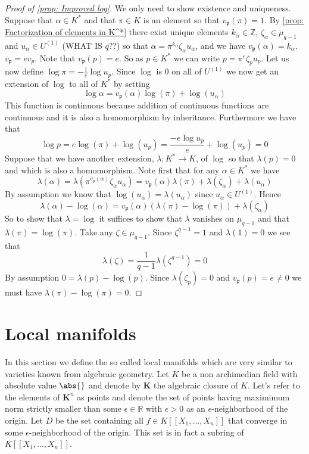 \documentclass{article}
\newcommand{\mfrak}[1]{\mathfrak{#1}}
\newcommand{\mbb}[1]{\mathbb{#1}}
\numberwithin{equation}{section}
\begin{document}
\begin{proof}[Proof of \cref{prop: Improved log}]
    We only need to show existence and uniqueness. Suppose that $\alpha \in K^*$ and that $\pi \in K$ is an element so that $v_\mfrak p(\pi) = 1$. By \cref{prop: Factorization of elements in K^*} there exist unique elements $k_\alpha \in \mbb Z$, $\zeta_\alpha \in \mu_{q-1}$ and $u_\alpha \in U^{(1)}$ (WHAT IS $q$??) so that $\alpha = \pi^{k_\alpha} \zeta_\alpha u_\alpha$, and we have $v_\mfrak p(\alpha) = k_\alpha$.
    $v_\mfrak p = e v_p$. Note that $v_{\mfrak p} (p) = e$. So as $p \in K^*$ we can write $p = \pi^{e}\zeta_p u_p$. Let us now define $\log \pi = -\frac{1}{e}\log u_p$. Since $\log$ is 0 on all of $U^{(1)}$ we now get an extension of $\log$ to all of $K^*$ by setting
    $$\log \alpha = v_\mfrak p(\alpha)\log(\pi) + \log(u_\alpha)$$
    This function is continuous because addition of continuous functions are continuous and it is also a homomorphism by inheritance. Furthermore we have that
    $$\log p = e\log(\pi) + \log(u_p) = \frac{-e\log u_p}{e} + \log(u_p) = 0 $$
    Suppose that we have another extension, $\lambda : K^* \to K$, of $\log$ so that $\lambda(p) = 0$ and which is also a homomorphism. Note first that for any $\alpha \in K^*$ we have
    $$\lambda(\alpha) = \lambda(\pi^{v_\mfrak p(\alpha)}\zeta_\alpha u_\alpha) = {v_\mfrak p(\alpha)}\lambda(\pi) + \lambda(\zeta_\alpha) + \lambda(u_\alpha)$$
    By assumption we know that $\log(u_\alpha) = \lambda(u_\alpha)$ since $u_\alpha \in U^{(1)}$. Hence
    $$\lambda(\alpha) - \log(\alpha) = {v_\mfrak p(\alpha)}(\lambda(\pi)-\log(\pi))  + \lambda(\zeta_\alpha)$$
    So to show that $\lambda = \log$ it suffices to show that $\lambda$ vanishes on $\mu_{q-1}$ and that $\lambda(\pi) = \log(\pi)$. Take any $\zeta \in \mu_{q-1}$. Since $\zeta^{q-1} = 1$ and $\lambda(1) = 0$ we see that
    $$\lambda(\zeta) = \frac{1}{q-1}\lambda(\zeta^{q-1}) = 0$$
    By assumption $0 = \lambda(p) - \log(p)$. Since $\lambda(\zeta_p) = 0$ and $v_\mfrak p(p) = e \neq 0$ we must have $\lambda(\pi) - \log(\pi) = 0$.
\end{proof}

\section{Local manifolds}
 
In this section we define the so called local manifolds which are very similar to varieties known from algebraic geometry. Let $K$ be a non archimedian field with absolute value $\abs{}$ and denote by $\bm K$ the algebraic closure of $K$. Let's refer to the elements of $\bm K^n$ as points and denote the set of points having maximimum norm strictly smaller than some $\epsilon \in \mbb R$ with $\epsilon > 0$ as an $\epsilon$-neighborhood of the origin. Let $D$ be the set containing all $f \in K[[X_1, ..., X_n]]$ that converge in some $\epsilon$-neighborhood of the origin. This set is in fact a subring of $K[[X_1, ..., X_n]]$.
\end{document}
